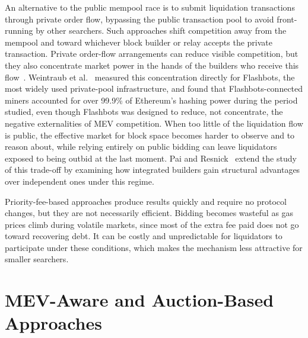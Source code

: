 \documentclass[conference]{IEEEtran}
\begin{document}
An alternative to the public mempool race is to submit liquidation
transactions through private order flow, bypassing the public
transaction pool to avoid front-running by other searchers. Such
approaches shift competition away from the mempool and toward whichever
block builder or relay accepts the private transaction. Private
order-flow arrangements can reduce visible competition, but they also
concentrate market power in the hands of the builders who receive this
flow~\cite{wang2024private}. Weintraub et al.~\cite{weintraub2022flashbot}
measured this concentration directly for Flashbots, the most widely used
private-pool infrastructure, and found that Flashbots-connected miners
accounted for over 99.9\% of Ethereum's hashing power during the period
studied, even though Flashbots was designed to reduce, not concentrate,
the negative externalities of MEV competition. When too little of the
liquidation flow is public, the effective market for block space becomes
harder to observe and to reason about, while relying entirely on public
bidding can leave liquidators exposed to being outbid at the last
moment. Pai and Resnick~\cite{pai2023structural} extend the study of
this trade-off by examining how integrated builders gain structural
advantages over independent ones under this regime.

Priority-fee-based approaches produce results quickly and require no
protocol changes, but they are not necessarily efficient. Bidding
becomes wasteful as gas prices climb during volatile markets, since most
of the extra fee paid does not go toward recovering debt. It can be
costly and unpredictable for liquidators to participate under these
conditions, which makes the mechanism less attractive for smaller
searchers.

\section{MEV-Aware and Auction-Based Approaches}
\end{document}
